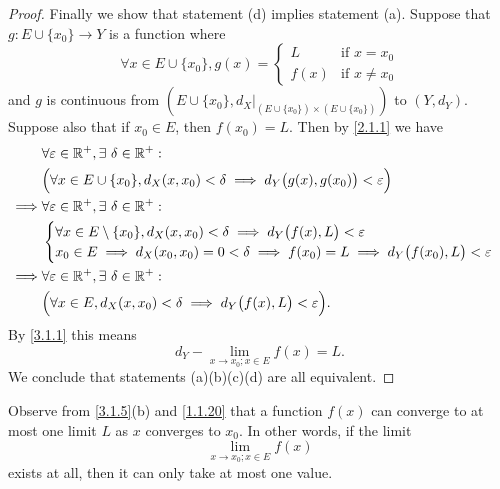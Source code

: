 \begin{proof}
  Finally we show that statement (d) implies statement (a).
  Suppose that \(g : E \cup \{x_0\} \to Y\) is a function where
  \[
    \forall x \in E \cup \{x_0\}, g(x) = \begin{cases}
      L    & \text{if } x = x_0    \\
      f(x) & \text{if } x \neq x_0
    \end{cases}
  \]
  and \(g\) is continuous from \((E \cup \{x_0\}, d_X|_{(E \cup \{x_0\}) \times (E \cup \{x_0\})})\) to \((Y, d_Y)\).
  Suppose also that if \(x_0 \in E\), then \(f(x_0) = L\).
  Then by \cref{2.1.1} we have
  \begin{align*}
             & \forall \varepsilon \in \mathbb{R}^+, \exists\ \delta \in \mathbb{R}^+ :                                                       \\
             & \Big(\forall x \in E \cup \{x_0\}, d_X(x, x_0) < \delta \implies d_Y\big(g(x), g(x_0)\big) < \varepsilon\Big)  \\
    \implies & \forall \varepsilon \in \mathbb{R}^+, \exists\ \delta \in \mathbb{R}^+ :                                                       \\
             & \begin{cases}
                 \forall x \in E \setminus \{x_0\}, d_X(x, x_0) < \delta \implies d_Y\big(f(x), L\big) < \varepsilon \\
                 x_0 \in E \implies d_X(x_0, x_0) = 0 < \delta \implies f(x_0) = L \implies d_Y\big(f(x_0), L\big) < \varepsilon
               \end{cases} \\
    \implies & \forall \varepsilon \in \mathbb{R}^+, \exists\ \delta \in \mathbb{R}^+ :                                                       \\
             & \Big(\forall x \in E, d_X(x, x_0) < \delta \implies d_Y\big(f(x), L\big) < \varepsilon\Big).
  \end{align*}
  By \cref{3.1.1} this means
  \[
    d_Y - \lim_{x \to x_0 ; x \in E} f(x) = L.
  \]
  We conclude that statements (a)(b)(c)(d) are all equivalent.
\end{proof}

\begin{rmk}\label{3.1.6}
  Observe from \cref{3.1.5}(b) and \cref{1.1.20} that a function \(f(x)\) can converge to at most one limit \(L\) as \(x\) converges to \(x_0\).
  In other words, if the limit
  \[
    \lim_{x \to x_0 ; x \in E} f(x)
  \]
  exists at all, then it can only take at most one value.
\end{rmk}

